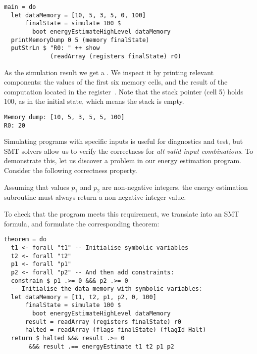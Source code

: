 \begin{verbatim}
main = do
  let dataMemory = [10, 5, 3, 5, 0, 100]
      finalState = simulate 100 $
        boot energyEstimateHighLevel dataMemory
  printMemoryDump 0 5 (memory finalState)
  putStrLn $ "R0: " ++ show
             (readArray (registers finalState) r0)
\end{verbatim}

\noindent
As the simulation result we get a . We inspect it by
printing relevant components: the values of the first six memory cells, and the
result of the computation located in the register~. Note that the stack
pointer (cell 5) holds 100, as in the initial state, which means the stack is empty.

\begin{verbatim}
Memory dump: [10, 5, 3, 5, 5, 100]
R0: 20
\end{verbatim}

Simulating programs with specific inputs is useful for diagnostics and test, but
SMT solvers allow us to verify the correctness for \emph{all valid input
combinations}. To demonstrate this, let us discover a problem in our energy
estimation program. Consider the following correctness property.


\begin{tcolorbox}
Assuming that values $p_1$ and $p_2$ are non-negative integers, the energy
estimation subroutine must always return a non-negative integer value.
\end{tcolorbox}

To check that the program meets this requirement, we translate
 into an SMT formula,
and formulate the corresponding theorem:

\begin{verbatim}
theorem = do
  t1 <- forall "t1" -- Initialise symbolic variables
  t2 <- forall "t2"
  p1 <- forall "p1"
  p2 <- forall "p2" -- And then add constraints:
  constrain $ p1 .>= 0 &&& p2 .>= 0
  -- Initialise the data memory with symbolic variables:
  let dataMemory = [t1, t2, p1, p2, 0, 100]
      finalState = simulate 100 $
        boot energyEstimateHighLevel dataMemory
      result = readArray (registers finalState) r0
      halted = readArray (flags finalState) (flagId Halt)
  return $ halted &&& result .>= 0
       &&& result .== energyEstimate t1 t2 p1 p2
\end{verbatim}

